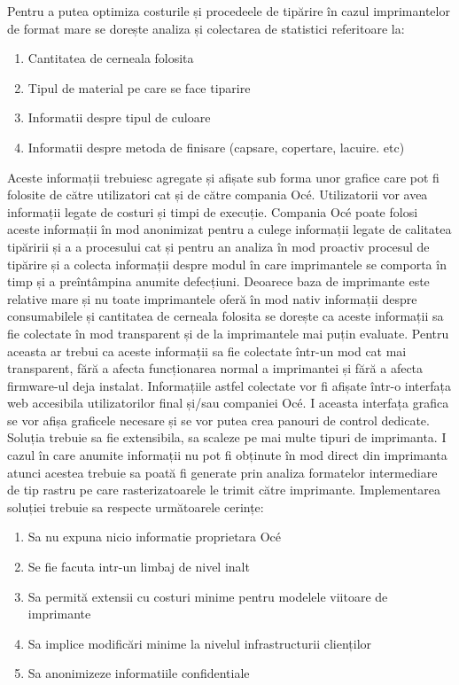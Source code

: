 \documentclass[a4paper, 12pt, twoside]{report}
\begin{document}
Pentru a putea optimiza costurile și procedeele de tipărire în cazul imprimantelor de format mare se dorește analiza și colectarea de statistici referitoare la: 
\begin{enumerate}
\item Cantitatea de cerneala folosita
\item Tipul de material pe care se face tiparire
\item Informatii despre tipul de culoare
\item Informatii despre metoda de finisare (capsare, copertare, lacuire. etc)
\end{enumerate}
Aceste informații trebuiesc agregate și afișate sub forma unor grafice care pot fi folosite de către utilizatori cat și de către compania Océ. Utilizatorii vor avea informații legate de costuri și timpi de execuție. Compania Océ poate folosi aceste informații în mod anonimizat pentru a culege informații legate de calitatea tipăririi și a a procesului cat și pentru an analiza în mod proactiv procesul de tipărire și a colecta informații despre modul în care imprimantele se comporta în timp și a preîntâmpina anumite defecțiuni.
Deoarece baza de imprimante este relative mare și nu toate imprimantele oferă în mod nativ informații despre consumabilele și cantitatea de cerneala folosita se dorește ca aceste informații sa fie colectate în mod transparent și de la imprimantele mai puțin evaluate. Pentru aceasta ar trebui ca aceste informații sa fie colectate într-un mod cat mai transparent, fără a afecta funcționarea normal a imprimantei și fără a afecta firmware-ul deja instalat.
Informațiile astfel colectate vor fi afișate într-o interfața web accesibila utilizatorilor final și/sau companiei Océ. I aceasta interfața grafica se vor afișa graficele necesare și se vor putea crea panouri de control dedicate.
Soluția trebuie sa fie extensibila, sa scaleze pe mai multe tipuri de imprimanta.
I cazul în care anumite informații nu pot fi obținute în mod direct din imprimanta atunci acestea trebuie sa poată fi generate prin analiza formatelor intermediare de tip rastru pe care rasterizatoarele le trimit către imprimante.
Implementarea soluției trebuie sa respecte următoarele cerințe:
\begin{enumerate}
\item Sa nu expuna nicio informatie proprietara Océ
\item Se fie facuta intr-un limbaj de nivel inalt
\item Sa permită extensii cu costuri minime pentru modelele viitoare de imprimante
\item Sa implice modificări minime la nivelul infrastructurii clienților
\item Sa anonimizeze informatiile confidentiale
\end{enumerate}
\end{document}
